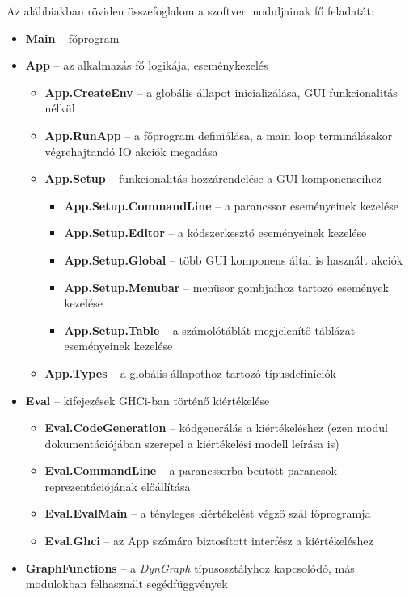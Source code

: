 Az alábbiakban röviden összefoglalom a szoftver moduljainak fő feladatát:

\begin{itemize}
	\item \textbf{Main} -- főprogram
	\item \textbf{App} -- az alkalmazás fő logikája, eseménykezelés
	\begin{itemize}
		\item \textbf{App.CreateEnv} -- a globális állapot inicializálása, GUI funkcionalitás nélkül
		\item \textbf{App.RunApp} -- a főprogram definiálása, a main loop terminálásakor végrehajtandó IO akciók megadása
		\item \textbf{App.Setup}	-- funkcionalitás hozzárendelése a GUI komponenseihez
		\begin{itemize}
			\item \textbf{App.Setup.CommandLine} -- a parancssor eseményeinek kezelése
			\item \textbf{App.Setup.Editor} -- a kódszerkesztő eseményeinek kezelése
			\item \textbf{App.Setup.Global} -- több GUI komponens által is használt akciók
			\item \textbf{App.Setup.Menubar} -- menüsor gombjaihoz tartozó események kezelése
			\item \textbf{App.Setup.Table} -- a számolótáblát megjelenítő táblázat eseményeinek kezelése
		\end{itemize}
		\item \textbf{App.Types} -- a globális állapothoz tartozó típusdefiníciók
	\end{itemize}
	\item \textbf{Eval} -- kifejezések GHCi-ban történő kiértékelése
	\begin{itemize}
		\item \textbf{Eval.CodeGeneration} -- kódgenerálás a kiértékeléshez (ezen modul dokumentációjában szerepel a kiértékelési modell leírása is)
		\item \textbf{Eval.CommandLine} -- a parancssorba beütött parancsok reprezentációjának előállítása
		\item \textbf{Eval.EvalMain} -- a tényleges kiértékelést végző szál főprogramja
		\item \textbf{Eval.Ghci} -- az App számára biztosított interfész a kiértékeléshez
	\end{itemize}
	\item \textbf{GraphFunctions} -- a \textit{DynGraph} típusosztályhoz kapcsolódó, más modulokban felhasznált segédfüggvények 	

\end{itemize}
